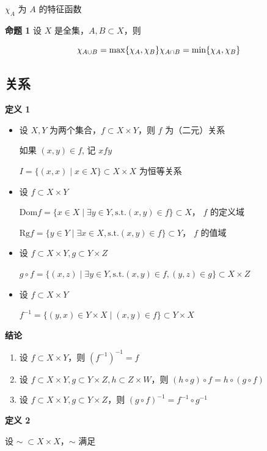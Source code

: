 \(\chi_A\) 为 \(A\) 的特征函数

\textbf{命题 1} 设 \(X\) 是全集，\(A,B\subset X\)，则

\[
\chi_{A \cup B} = \max\{\chi_A, \chi_B\} \\
\chi_{A \cap B} = \min\{\chi_A, \chi_B\}
\]

\subsection{关系}\label{ux5173ux7cfb}

\textbf{定义 1}

\begin{itemize}
\item
  设 \(X, Y\) 为两个集合，\(f \subset X \times Y\)，则 \(f\)
  为（二元）关系

  如果 \((x,y)\in f\), 记 \(xfy\)

  \(I=\{(x,x) \mid x\in X\}\subset X \times X\) 为恒等关系
\item
  设 \(f \subset X \times Y\)

  \(\mathrm{Dom} f=\{ x\in X \mid \exists y\in Y, \text{s.t.}  (x, y) \in f\}\subset X\)，
  \(f\) 的定义域

  \(\mathrm{Rg} f=\{ y\in Y \mid \exists x\in X, \text{s.t.}  (x, y) \in f\}\subset Y\)，
  \(f\) 的值域
\item
  设 \(f\subset X\times Y, g\subset Y \times Z\)

  \(g \circ f=\{(x, z) \mid \exists y\in Y, \text{s.t.}  (x, y)\in f, (y, z)\in g\} \subset X\times Z\)
\item
  设 \(f\subset X\times Y\)

  \(f^{-1}=\{(y,x)\in Y\times X \mid (x, y) \in f\}\subset Y \times X\)
\end{itemize}

\textbf{结论}

\begin{enumerate}
\def\labelenumi{\arabic{enumi}.}
\tightlist
\item
  设 \(f\subset X\times Y\)，则 \((f^{-1})^{-1}=f\)
\item
  设 \(f\subset X\times Y, g\subset Y\times Z, h \subset Z\times W\)，则
  \((h\circ g)\circ f=h \circ (g\circ f)\)
\item
  设 \(f\subset X\times Y, g\subset  Y\times Z\)，则
  \((g\circ f)^{-1}=f^{-1}\circ g^{-1}\)
\end{enumerate}

\textbf{定义 2}

设 \(\sim \; \subset X \times X\)，\(\sim\) 满足


